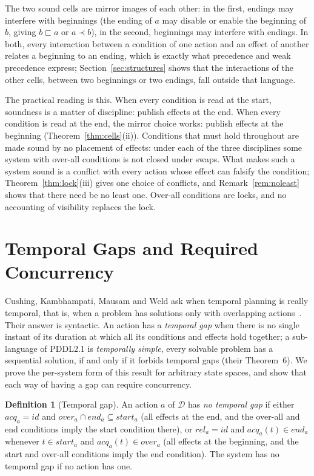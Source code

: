 \documentclass[preprint,12pt]{elsarticle}
\theoremstyle{plain}
\theoremstyle{definition}
\newtheorem{definition}[theorem]{Definition}
\newcommand{\st}{\mathit{start}}
\newcommand{\ovr}{\mathit{over}}
\newcommand{\stp}{\mathit{end}}
\newcommand{\acq}{\mathit{acq}}
\newcommand{\rel}{\mathit{rel}}
\newcommand{\id}{\mathit{id}}
\newcommand{\D}{\mathcal{D}}
\newcommand{\wprec}{\sqsubset}
\begin{document}
The two sound cells are mirror images of each other: in the first, endings may interfere with beginnings (the ending of $a$ may disable or enable the beginning of $b$, giving $b \wprec a$ or $a \prec b$), in the second, beginnings may interfere with endings. In both, every interaction between a condition of one action and an effect of another relates a beginning to an ending, which is exactly what precedence and weak precedence express; Section~\ref{sec:structures} shows that the interactions of the other cells, between two beginnings or two endings, fall outside that language.

The practical reading is this. When every condition is read at the start, soundness is a matter of discipline: publish effects at the end. When every condition is read at the end, the mirror choice works: publish effects at the beginning (Theorem~\ref{thm:cells}(ii)). Conditions that must hold throughout are made sound by no placement of effects: under each of the three disciplines some system with over-all conditions is not closed under swaps. What makes such a system sound is a conflict with every action whose effect can falsify the condition; Theorem~\ref{thm:lock}(iii) gives one choice of conflicts, and Remark~\ref{rem:noleast} shows that there need be no least one. Over-all conditions are locks, and no accounting of visibility replaces the lock.

\section{Temporal Gaps and Required Concurrency}
\label{sec:gap}

Cushing, Kambhampati, Mausam and Weld ask when temporal planning is really temporal, that is, when a problem has solutions only with overlapping actions~\cite{CushingEtAl2007}. Their answer is syntactic. An action has a \emph{temporal gap} when there is no single instant of its duration at which all its conditions and effects hold together; a sub-language of PDDL2.1 is \emph{temporally simple}, every solvable problem has a sequential solution, if and only if it forbids temporal gaps (their Theorem~6). We prove the per-system form of this result for arbitrary state spaces, and show that each way of having a gap can require concurrency.

\begin{definition}[Temporal gap]
\label{def:gap}
An action $a$ of $\D$ has \emph{no temporal gap} if either $\acq_a = \id$ and $\ovr_a \cap \stp_a \subseteq \st_a$ (all effects at the end, and the over-all and end conditions imply the start condition there), or $\rel_a = \id$ and $\acq_a(t) \in \stp_a$ whenever $t \in \st_a$ and $\acq_a(t) \in \ovr_a$ (all effects at the beginning, and the start and over-all conditions imply the end condition). The system has no temporal gap if no action has one.
\end{definition}
\end{document}
